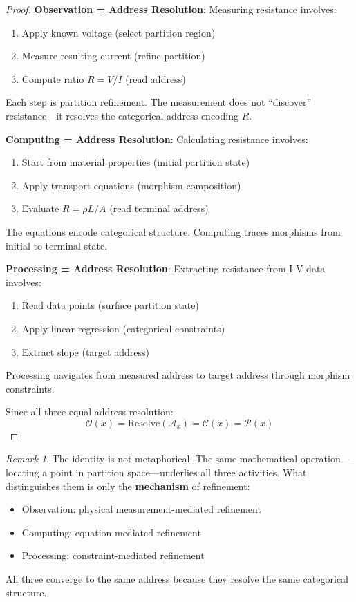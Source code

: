 \documentclass[twocolumn,10pt]{article}
\theoremstyle{definition}
\theoremstyle{remark}
\newtheorem{remark}[theorem]{Remark}
\newcommand{\Obs}{\mathcal{O}}
\newcommand{\Comp}{\mathcal{C}}
\newcommand{\Proc}{\mathcal{P}}
\begin{document}
\begin{proof}
\textbf{Observation = Address Resolution}:
Measuring resistance involves:
\begin{enumerate}
    \item Apply known voltage (select partition region)
    \item Measure resulting current (refine partition)
    \item Compute ratio $R = V/I$ (read address)
\end{enumerate}
Each step is partition refinement. The measurement does not ``discover'' resistance---it resolves the categorical address encoding $R$.

\textbf{Computing = Address Resolution}:
Calculating resistance involves:
\begin{enumerate}
    \item Start from material properties (initial partition state)
    \item Apply transport equations (morphism composition)
    \item Evaluate $R = \rho L/A$ (read terminal address)
\end{enumerate}
The equations encode categorical structure. Computing traces morphisms from initial to terminal state.

\textbf{Processing = Address Resolution}:
Extracting resistance from I-V data involves:
\begin{enumerate}
    \item Read data points (surface partition state)
    \item Apply linear regression (categorical constraints)
    \item Extract slope (target address)
\end{enumerate}
Processing navigates from measured address to target address through morphism constraints.

Since all three equal address resolution:
\begin{equation}
\Obs(x) = \text{Resolve}(\mathcal{A}_x) = \Comp(x) = \Proc(x)
\end{equation}
\end{proof}

\begin{remark}
The identity is not metaphorical. The same mathematical operation---locating a point in partition space---underlies all three activities. What distinguishes them is only the \textbf{mechanism} of refinement:
\begin{itemize}
    \item Observation: physical measurement-mediated refinement
    \item Computing: equation-mediated refinement
    \item Processing: constraint-mediated refinement
\end{itemize}
All three converge to the same address because they resolve the same categorical structure.
\end{remark}
\end{document}
